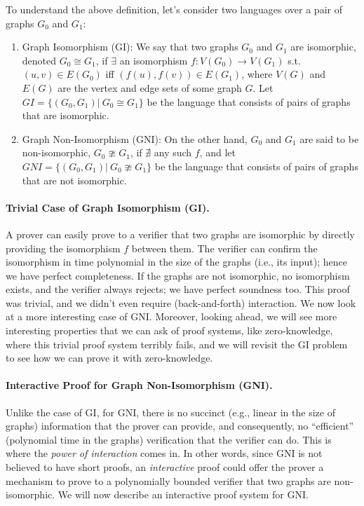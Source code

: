 To understand the above definition, let's consider two languages over a pair of graphs $G_0$ and $G_1$: 
\begin{enumerate}
	\item Graph Isomorphism (GI): We say that two graphs $G_0$ and $G_1$ are isomorphic, denoted $G_0 \cong G_1$, if $\exists$ an isomorphism $f: V(G_0) \rightarrow V(G_1)$ s.t. $(u,v)\in E(G_0)$ iff $(f(u),f(v))\in E(G_1)$, where $V(G)$ and $E(G)$ are the vertex and edge sets of some graph $G$. Let $GI=\lbrace(G_0,G_1)|\  G_0\cong G_1\rbrace$ be the language that consists of pairs of graphs that are isomorphic.
	\item Graph Non-Isomorphism (GNI): On the other hand, $G_0$ and $G_1$ are said to be non-isomorphic, $G_0 \ncong G_1$, if $\nexists$ any such $f$, and let $GNI=\lbrace(G_0,G_1)|\  G_0\ncong G_1\rbrace$ be the language that consists of pairs of graphs that are not isomorphic.
\end{enumerate}
 
\paragraph{Trivial Case of Graph Isomorphism (GI).} A prover can easily prove to a verifier that two graphs are isomorphic by directly providing the isomorphism $f$ between them. The verifier can confirm the isomorphism in time polynomial in the size of the graphs (i.e., its input); hence we have perfect completeness. If the graphs are not isomorphic, no isomorphism exists, and the verifier always rejects; we have perfect soundness too. This proof was trivial, and we didn't even require (back-and-forth) interaction. We now look at a more interesting case of GNI. Moreover, looking ahead, we will see more interesting properties that we can ask of proof systems, like zero-knowledge, where this trivial proof system terribly fails, and we will revisit the GI problem to see how we can prove it with zero-knowledge.

\paragraph{Interactive Proof for Graph Non-Isomorphism (GNI).}  Unlike the case of GI, for GNI, there is no succinct (e.g., linear in the size of graphs) information that the prover can provide, and consequently, no ``efficient'' (polynomial time in the graphs) verification that the verifier can do. This is where the {\em power of interaction} comes in. In other words, since GNI is not believed to have short proofs, an {\em interactive} proof could offer the prover a mechanism to prove to a polynomially bounded verifier that two graphs are non-isomorphic. We will now describe an interactive proof system for GNI.

